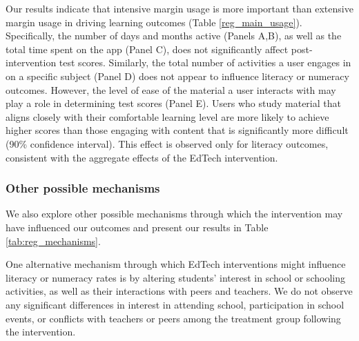 \documentclass[hidelinks,12pt]{article}
\begin{document}
\begin{singlespace}
Our results indicate that intensive margin usage is more important than extensive margin usage in driving learning outcomes (Table \ref{reg_main_usage}). Specifically, the number of days and months active (Panels A,B), as well as the total time spent on the app (Panel C), does not significantly affect post-intervention test scores. Similarly, the total number of activities a user engages in on a specific subject (Panel D) does not appear to influence literacy or numeracy outcomes. However, the level of ease of the material a user interacts with may play a role in determining test scores (Panel E). Users who study material that aligns closely with their comfortable learning level are more likely to achieve higher scores than those engaging with content that is significantly more difficult (90\% confidence interval). This effect is observed only for literacy outcomes, consistent with the aggregate effects of the EdTech intervention.

\subsubsection{Other possible mechanisms} %
We also explore other possible mechanisms through which the intervention may have influenced our outcomes and present our results in Table \ref{tab:reg_mechanisms}.

One alternative mechanism through which EdTech interventions might influence literacy or numeracy rates is by altering students' interest in school or schooling activities, as well as their interactions with peers and teachers. We do not observe any significant differences in interest in attending school, participation in school events, or conflicts with teachers or peers among the treatment group following the intervention.


\end{singlespace}
\end{document}
